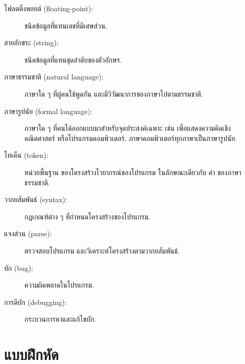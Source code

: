 \begin{description}
\item[โฟลตติ้งพอยต์ (floating-point):] ชนิดข้อมูลที่แทนเลขที่มีเศษส่วน.

\item[สายอักขระ (string):] ชนิดข้อมูลที่แทนชุดลำดับของตัวอักษร.

\item[ภาษาธรรมชาติ (natural language):]  
ภาษาใด ๆ ที่ผู้คนใช้พูดกัน และมีวิวัฒนาการของภาษาไปตามธรรมชาติ.

\item[ภาษารูปนัย (formal language):]  
ภาษาใด ๆ ที่คนได้ออกแบบมาสำหรับจุดประสงค์เฉพาะ 
เช่น เพื่อแสดงความคิดเชิงคณิตศาสตร์ หรือโปรแกรมคอมพิวเตอร์.
ภาษาคอมพิวเตอร์ทุกภาษาเป็นภาษารูปนัย.

\item[โทเค็น (token):] 
หน่วยพื้นฐาน ของโครงสร้างไวยากรณ์ของโปรแกรม 
ในลักษณะเดียวกับ คำ ของภาษาธรรมชาติ.

\item[วากยสัมพันธ์ (syntax):] กฏเกณฑ์ต่าง ๆ ที่กำหนดโครงสร้างของโปรแกรม.

\item[แจงส่วน (parse):] 
ตรวจสอบโปรแกรม และวิเคราะห์โครงสร้างตามวากยสัมพันธ์.

\item[บัก (bug):] 
ความผิดพลาดในโปรแกรม.

\item[การดีบัก (debugging):] 
กระบวนการหาและแก้ไขบัก.

\end{description}


\section{แบบฝึกหัด}


